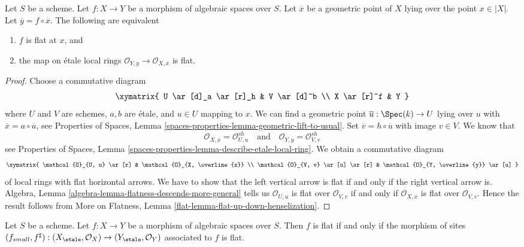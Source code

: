 \begin{lemma}
\label{lemma-flat-at-point-etale-local-rings}
Let $S$ be a scheme.
Let $f : X \to Y$ be a morphism of algebraic spaces over $S$.
Let $\overline{x}$ be a geometric point of $X$ lying over the point
$x \in |X|$. Let $\overline{y} = f \circ \overline{x}$. The following
are equivalent
\begin{enumerate}
\item $f$ is flat at $x$, and
\item the map on \'etale local rings
$\mathcal{O}_{Y, \overline{y}} \to \mathcal{O}_{X, \overline{x}}$
is flat.
\end{enumerate}
\end{lemma}

\begin{proof}
Choose a commutative diagram
$$
\xymatrix{
U \ar[d]_a \ar[r]_h & V \ar[d]^b \\
X \ar[r]^f & Y
}
$$
where $U$ and $V$ are schemes, $a, b$ are \'etale, and
$u \in U$ mapping to $x$. We can find a geometric point
$\overline{u} : \Spec(k) \to U$ lying over $u$ with
$\overline{x} = a \circ \overline{u}$, see
Properties of Spaces, Lemma
\ref{spaces-properties-lemma-geometric-lift-to-usual}.
Set $\overline{v} = h \circ \overline{u}$ with image $v \in V$.
We know that
$$
\mathcal{O}_{X, \overline{x}} = \mathcal{O}_{U, u}^{sh}
\quad\text{and}\quad
\mathcal{O}_{Y, \overline{y}} = \mathcal{O}_{V, v}^{sh}
$$
see
Properties of Spaces, Lemma
\ref{spaces-properties-lemma-describe-etale-local-ring}.
We obtain a commutative diagram
$$
\xymatrix{
\mathcal{O}_{U, u} \ar[r] &
\mathcal{O}_{X, \overline{x}} \\
\mathcal{O}_{V, v} \ar[u] \ar[r] &
\mathcal{O}_{Y, \overline{y}} \ar[u]
}
$$
of local rings with flat horizontal arrows. We have to show that the
left vertical arrow is flat if and only if the right vertical arrow is.
Algebra, Lemma \ref{algebra-lemma-flatness-descends-more-general}
tells us $\mathcal{O}_{U, u}$ is flat over $\mathcal{O}_{V, v}$
if and only if $\mathcal{O}_{X, \overline{x}}$ is flat over
$\mathcal{O}_{V, v}$. Hence the result follows from
More on Flatness, Lemma \ref{flat-lemma-flat-up-down-henselization}.
\end{proof}

\begin{lemma}
\label{lemma-flat-morphism-sites}
Let $S$ be a scheme.
Let $f : X \to Y$ be a morphism of algebraic spaces over $S$.
Then $f$ is flat if and only if the morphism of sites
$
(f_{small}, f^\sharp) :
(X_\etale, \mathcal{O}_X)
\to
(Y_\etale, \mathcal{O}_Y)
$
associated to $f$ is flat.
\end{lemma}

